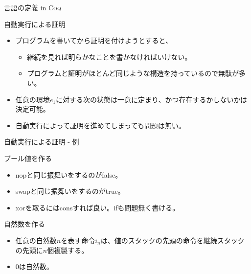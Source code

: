 \documentclass[cjk, 14pt, dvipdfm]{beamer}
\newcommand{\Coq}{{\scshape{}Coq}}
\begin{document}
\begin{frame}{言語の定義 in \Coq}

\end{frame}

\begin{frame}{自動実行による証明}

  \begin{itemize}
    \item プログラムを書いてから証明を付けようとすると、
    \begin{itemize}
      \item 継続を見れば明らかなことを書かなければいけない。
      \item プログラムと証明がほとんど同じような構造を持っているので無駄が多い。
    \end{itemize}
    \item 任意の環境$e_1$に対する次の状態は一意に定まり、かつ存在するかしないかは決定可能。
    \item 自動実行によって証明を進めてしまっても問題は無い。
  \end{itemize}

\end{frame}

\begin{frame}{自動実行による証明 - 例}

\end{frame}

\begin{frame}{ブール値を作る}

  \begin{itemize}
    \item nopと同じ振舞いをするのがfalse。
    \item swapと同じ振舞いをするのがtrue。
    \item xorを取るにはconsすれば良い。ifも問題無く書ける。
  \end{itemize}

\end{frame}

\begin{frame}{自然数を作る}

  \begin{itemize}
    \item 任意の自然数$n$を表す命令$i_n$は、値のスタックの先頭の命令を継続スタックの先頭に$n$個複製する。
    \item 0は自然数。
  \end{itemize}

\end{frame}
\end{document}
